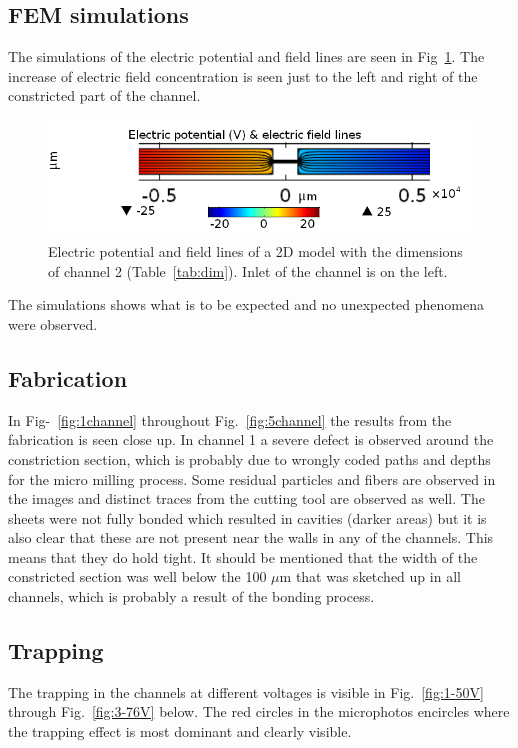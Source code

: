 \documentclass[journal, a4paper]{IEEEtran}
\begin{document}
\subsection{FEM simulations}
The simulations of the electric potential and field lines are seen in Fig~\ref{fig:potField}. The increase of electric field concentration is seen just to the left and right of the constricted part of the channel.
\begin{figure}[!hbt]
	\begin{center}
		\includegraphics[width=\columnwidth]{images/potFieldW1000d100_new.png}
		\caption{\label{fig:potField} Electric potential and field lines of a 2D model with the dimensions of channel 2 (Table~\ref{tab:dim}). Inlet of the channel is on the left.}
	\end{center}
\end{figure}

The simulations shows what is to be expected and no unexpected phenomena were observed.

\subsection{Fabrication}
In Fig-~\ref{fig:1channel} throughout Fig.~\ref{fig:5channel} the results from the fabrication is seen close up. In channel 1 a severe defect is observed around the constriction section, which is probably due to wrongly coded paths and depths for the micro milling process. Some residual particles and fibers are observed in the images and distinct traces from the cutting tool are observed as well. The sheets were not fully bonded which resulted in cavities (darker areas) but it is also clear that these are not present near the walls in any of the channels. This means that they do hold tight. It should be mentioned that the width of the constricted section was well below the 100 $\mu$m that was sketched up in all channels, which is probably a result of the bonding process.

\subsection{Trapping}
The trapping in the channels at different voltages is visible in Fig.~\ref{fig:1-50V} 
through Fig.~\ref{fig:3-76V} below. The red circles in the microphotos encircles where the trapping effect is most dominant and clearly visible.
\end{document}
